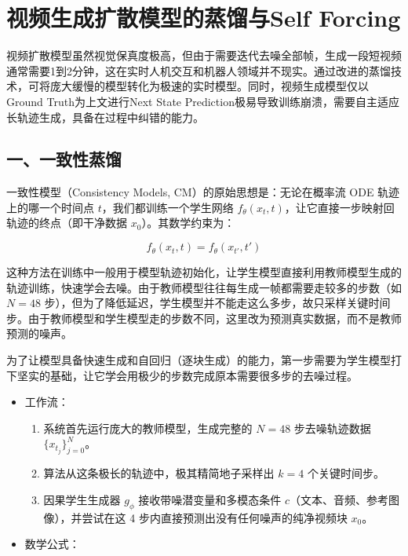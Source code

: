 \setcounter{section}{3}

\hypertarget{ux89c6ux9891ux751fux6210ux6269ux6563ux6a21ux578bux7684ux84b8ux998fux4e0eself-forcing}{%
\section{视频生成扩散模型的蒸馏与Self Forcing}\label{ux89c6ux9891ux751fux6210ux6269ux6563ux6a21ux578bux7684ux84b8ux998fux4e0eself-forcing}}

视频扩散模型虽然视觉保真度极高，但由于需要迭代去噪全部帧，生成一段短视频通常需要1到2分钟，这在实时人机交互和机器人领域并不现实。通过改进的蒸馏技术，可将庞大缓慢的模型转化为极速的实时模型。同时，视频生成模型仅以Ground Truth为上文进行Next State Prediction极易导致训练崩溃，需要自主适应长轨迹生成，具备在过程中纠错的能力。

\hypertarget{ux4e00ux4e00ux81f4ux6027ux84b8ux998f}{%
\subsection{一、一致性蒸馏}\label{ux4e00ux4e00ux81f4ux6027ux84b8ux998f}}

一致性模型（Consistency Models, CM）的原始思想是：无论在概率流 ODE 轨迹上的哪一个时间点 \(t\)，我们都训练一个学生网络 \(f_\theta(x_t,t)\)，让它直接一步映射回轨迹的终点（即干净数据 \(x_0\)）。其数学约束为：

\[
f_\theta(x_t,t)=f_\theta(x_{t'},t')
\]

这种方法在训练中一般用于模型轨迹初始化，让学生模型直接利用教师模型生成的轨迹训练，快速学会去噪。由于教师模型往往每生成一帧都需要走较多的步数（如 \(N=48\) 步），但为了降低延迟，学生模型并不能走这么多步，故只采样关键时间步。由于教师模型和学生模型走的步数不同，这里改为预测真实数据，而不是教师预测的噪声。

为了让模型具备快速生成和自回归（逐块生成）的能力，第一步需要为学生模型打下坚实的基础，让它学会用极少的步数完成原本需要很多步的去噪过程。

\begin{itemize}
\tightlist
\item
{}
  工作流：

  \begin{enumerate}
  \def\labelenumi{\arabic{enumi}.}
  \tightlist
  \item
    系统首先运行庞大的教师模型，生成完整的 \(N=48\) 步去噪轨迹数据 \(\{x_{t_j}\}_{j=0}^{N}\)。
  \item
    算法从这条极长的轨迹中，极其精简地子采样出 \(k=4\) 个关键时间步。
  \item
    因果学生生成器 \(g_\phi\) 接收带噪潜变量和多模态条件 \(c\)（文本、音频、参考图像），并尝试在这 4 步内直接预测出没有任何噪声的纯净视频块 \(x_0\)。
  \end{enumerate}
\item
{}
  数学公式：
\end{itemize}

